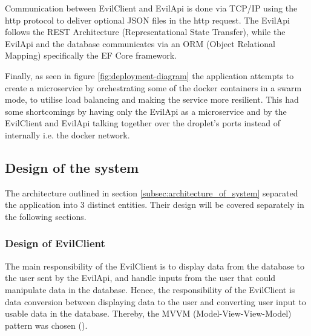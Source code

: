 \documentclass[report/main.tex]{subfiles}
\begin{document}
            Communication between EvilClient and EvilApi is done via TCP/IP using the http protocol to deliver optional JSON files in the http request. The EvilApi follows the REST Architecture (Representational State Transfer), while the EvilApi and the database communicates via an ORM (Object Relational Mapping) specifically the EF Core framework.
            
            Finally, as seen in figure \ref{fig:deployment-diagram} the application attempts to create a microservice by orchestrating some of the docker containers in a swarm mode, to utilise load balancing and making the service more resilient. This had some shortcomings by having only the EvilApi as a microservice and by the EvilClient and EvilApi talking together over the droplet's ports instead of internally i.e. the docker network.
    
        \subsection{Design of the system}
        \label{subsec:design_of_system}
            The architecture outlined in section \ref{subsec:architecture_of_system} separated the application into 3 distinct entities. Their design will be covered separately in the following sections.
            
            \subsubsection{Design of EvilClient}
            \label{subsubsec:architexture_of_evilclient}
                The main responsibility of the EvilClient is to display data from the database to the user sent by the EvilApi, and handle inputs from the user that could manipulate data in the database. Hence, the responsibility of the EvilClient is data conversion between displaying data to the user and converting user input to usable data in the database. Thereby, the MVVM (Model-View-View-Model) pattern was chosen (\cite{ms-mvvm}).
                
\end{document}
